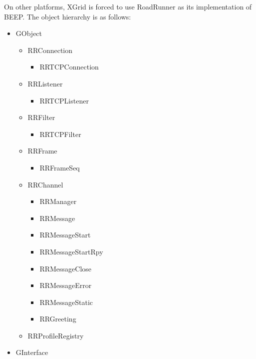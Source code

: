 On other platforms, XGrid is forced to use RoadRunner as its implementation of BEEP.   The object hierarchy  is as follows:
\begin{itemize}
\item GObject
\begin{itemize}
\item RRConnection
\begin{itemize}
\item RRTCPConnection
\end{itemize}
\item RRListener
\begin{itemize}
\item RRTCPListener
\end{itemize}
\item RRFilter
\begin{itemize}
\item RRTCPFilter
\end{itemize}
\item RRFrame
\begin {itemize}
\item RRFrameSeq
\end {itemize}
\item RRChannel
\begin {itemize}
\item RRManager
\end{itemize}
\begin {itemize}
\item RRMessage
\end {itemize}
\begin{itemize}
\item RRMessageStart
\item RRMessageStartRpy
\item RRMessageClose
\item RRMessageError
\item RRMessageStatic
\item RRGreeting
\end{itemize}
\item RRProfileRegistry
\end{itemize}
\item GInterface
\end{itemize}

